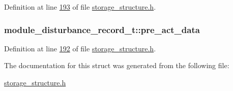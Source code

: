 Definition at line \hyperlink{a00003_source_l00193}{193} of file \hyperlink{a00003_source}{storage\+\_\+structure.\+h}.

\hypertarget{a00008_ac8e7141463960fd1e27eb25547d02555}{
\subsubsection[{pre\+\_\+act\+\_\+data}]{ module\+\_\+disturbance\+\_\+record\+\_\+t\+::pre\+\_\+act\+\_\+data}}\label{a00008_ac8e7141463960fd1e27eb25547d02555}


Definition at line \hyperlink{a00003_source_l00192}{192} of file \hyperlink{a00003_source}{storage\+\_\+structure.\+h}.



The documentation for this struct was generated from the following file\+:\begin{DoxyCompactItemize}
\item 
\hyperlink{a00003}{storage\+\_\+structure.\+h}\end{DoxyCompactItemize}
